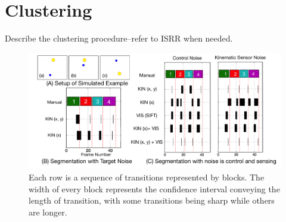 \section{Clustering}
Describe the clustering procedure--refer to ISRR when needed.


\begin{figure}[!t]
\centering
\includegraphics[width=0.8\linewidth]{figures/toyEx}
\caption{Each row is a sequence of transitions represented by blocks. The width of every block represents the confidence interval conveying the length of transition, with some transitions being sharp while others are longer.}
\label{fig:toyEx}
\vspace{-15pt}
\end{figure}